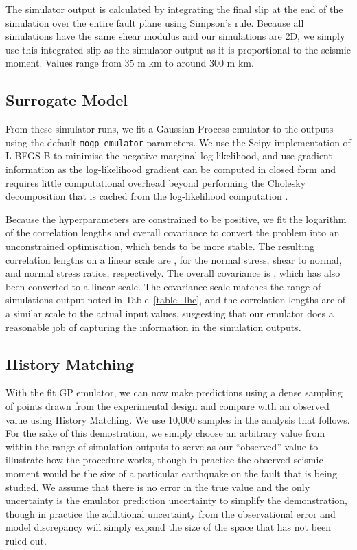 \documentclass[openacc]{rstransa}%
\begin{document}
The simulator output is calculated by integrating the final slip at the end of the simulation over the
entire fault plane using Simpson's rule. Because all simulations have the same shear modulus and our
simulations are 2D, we simply use this integrated slip as the simulator output as it is proportional
to the seismic moment. Values range from 35 m km to around 300 m km.

\subsection{Surrogate Model}

From these simulator runs, we fit a Gaussian Process emulator to the outputs using the default
\texttt{mogp\_emulator} parameters. We use the Scipy implementation of L-BFGS-B \cite{lbfgs} to minimise the
negative marginal log-likelihood, and use gradient information as the log-likelihood gradient
can be computed in closed form and requires little computational overhead beyond performing the
Cholesky decomposition that is cached from the log-likelihood computation \cite{gprw}.

Because the hyperparameters are constrained to be positive, we fit the logarithm of the correlation
lengths and overall covariance to convert the problem into an unconstrained optimisation, which tends
to be more stable. The resulting correlation lengths on a linear scale are \unskip,
for the normal stress, shear to normal, and normal stress ratios, respectively.
The overall covariance is \unskip, which has also been converted to a linear scale.
The covariance scale matches the range of simulations
output noted in Table~\ref{table_lhc}, and the correlation lengths are of a similar scale to the actual
input values, suggesting that our emulator does a reasonable job of capturing the information in
the simulation outputs.

\subsection{History Matching}

With the fit GP emulator, we can now make predictions using a dense sampling of points drawn from the
experimental design and compare with an observed value using History Matching. We use 10,000 samples
in the analysis that follows. For the sake of this demostration, we simply choose an arbitrary value
from within the range of simulation outputs to serve as our ``observed'' value to illustrate how the
procedure works, though in practice the observed seismic moment would be the size of a particular
earthquake on the fault that is being studied. We assume that there is no error in the true value
and the only uncertainty is the emulator prediction uncertainty to simplify the demonstration, though
in practice the additional uncertainty from the observational error and model discrepancy will simply
expand the size of the space that has not been ruled out.
\end{document}
